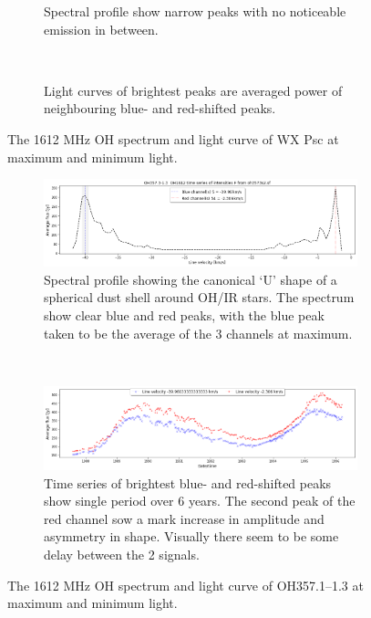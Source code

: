 \begin{figure}
\centering
  \begin{subfigure}{\hsize}
    \caption{Spectral profile show narrow peaks with no noticeable emission in between.}
    \label{fig:wxpscspectrum}
  \end{subfigure}%
  \\
  \begin{subfigure}{\hsize}
    \caption{Light curves of brightest peaks are averaged power of neighbouring blue- and red-shifted peaks.}
    \label{fig:wxpsctimeseries}
  \end{subfigure}%
\caption{\label{fig:wxpsc}The 1612 MHz OH spectrum and light curve of WX Psc at maximum and minimum light.}
\end{figure}


\begin{figure}
\centering
  \begin{subfigure}{\hsize}
    \includegraphics[width=0.95\hsize]{images/OH357_avg_spectrum.png}
    \caption{\label{fig:oh357spectrum}Spectral profile showing the canonical `U' shape of a spherical dust shell around OH/IR stars. The spectrum show clear blue and red peaks, with the blue peak taken to be the average of the 3 channels at maximum.}
  \end{subfigure}%
  \\
  \begin{subfigure}{\hsize}
    \includegraphics[width=0.95\hsize]{images/OH357_ts_blue5_red54.png}
    \caption{\label{fig:oh357timeseries}Time series of brightest blue- and red-shifted peaks show single period over 6 years. The second peak of the red channel sow a mark increase in amplitude and asymmetry in shape. Visually there seem to be some delay between the 2 signals.}    
  \end{subfigure}%
\caption{\label{fig:oh357}The 1612 MHz OH spectrum and light curve of OH357.1--1.3 at maximum and minimum light.}
\end{figure}

